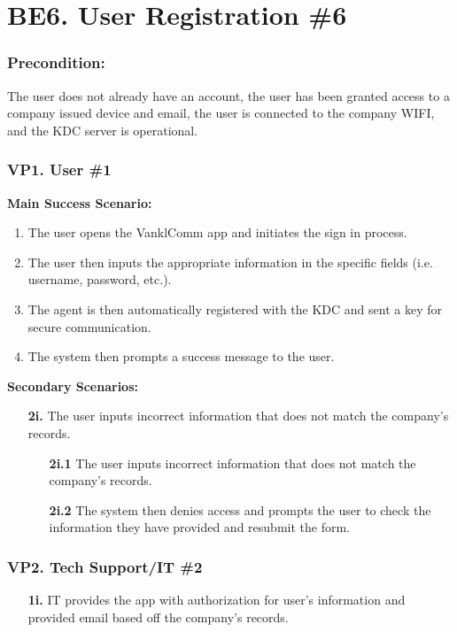 \documentclass[]{article}
\begin{document}
\section*{BE6. User Registration \#6}
\subsubsection*{Precondition:} The user does not already have an account, the user has been granted access to a company issued device and email, the user is connected to the company WIFI, and the KDC server is operational.
\subsubsection*{VP1. User \#1}
\textbf{Main Success Scenario:}
\begin{enumerate}
	\item The user opens the VanklComm app and initiates the sign in process.
	\item The user then inputs the appropriate information in the specific fields (i.e. username, password, etc.).
	\item The agent is then automatically registered with the KDC and sent a key for secure communication.
	\item The system then prompts a success message to the user.
\end{enumerate}
\textbf{Secondary Scenarios:}
\begin{enumerate}
	\item[\textbf{2i.}] The user inputs incorrect information that does not match the company’s records.
		\begin{enumerate}
			\item[\textbf{2i.1}] The user inputs incorrect information that does not match the company’s records.
			\item[\textbf{2i.2}] The system then denies access and prompts the user to check the information they have provided and resubmit the form.
		\end{enumerate}
\end{enumerate}
\subsubsection*{VP2. Tech Support/IT \#2}
\begin{enumerate}
	\item[\textbf{1i.}] IT provides the app with authorization for user's information and provided email based off the company's records.
\end{enumerate}
\end{document}
